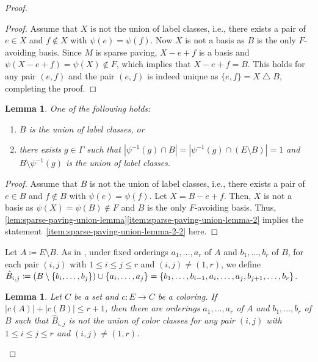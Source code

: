 \documentclass{article}
\DeclarePairedDelimiter{\set}{\{}{\}}
\newcommand{\symdif}{\mathbin{\triangle}}
\newtheorem{lemma}[theorem]{Lemma}
\theoremstyle{definition}
\begin{document}
\begin{proof}
\begin{proof}
    Assume that $X$ is not the union of label classes, i.e., there exists a pair of $e \in X$ and $f \notin X$ with $\psi(e) = \psi(f)$.
    Now $X$ is not a basis as $B$ is the only $F$-avoiding basis.
    Since $M$ is sparse paving, $X - e + f$ is a basis and $\psi(X - e + f) = \psi(X) \notin F$, which implies that $X - e + f = B$.
    This holds for any pair $(e, f)$ and the pair $(e, f)$ is indeed unique as $\{e, f\} = X \symdif B$, completing
    the proof.
\end{proof}

\begin{lemma}\label{lem:sparse-paving-union-lemma-2}
    One of the following holds:
    \begin{enumerate}[{label={\upshape (\arabic*)}}]
        \item $B$ is the union of label classes, or
        \item there exists $g \in \Gamma$ such that $|\psi^{-1}(g) \cap B| = |\psi^{-1}(g) \cap (E \setminus B)| = 1$ and $B \setminus \psi^{-1}(g)$ is the union of label classes.\label{item:sparse-paving-union-lemma-2-2}
    \end{enumerate}
\end{lemma}

\begin{proof}
    Assume that $B$ is not the union of label classes, i.e., there exists a pair of $e \in B$ and $f \notin B$ with $\psi(e) = \psi(f)$.
    Let $X = B - e + f$.
    Then, $X$ is not a basis as $\psi(X) = \psi(B) \notin F$ and $B$ is the only $F$-avoiding basis.
    Thus, \cref{lem:sparse-paving-union-lemma}\ref{item:sparse-paving-union-lemma-2} implies the statement~\ref{item:sparse-paving-union-lemma-2-2} here.
\end{proof}

Let $A \coloneqq E \setminus B$.
As in , under fixed orderings $a_1, \dotsc, a_r$ of $A$ and $b_1, \dotsc, b_r$ of $B$, for each pair $(i, j)$ with $1 \le i \le j \le r$ and $(i, j) \neq (1, r)$, we define $\hat{B}_{i,j}\coloneqq (B \setminus \set{b_i, \dotsc, b_j}) \cup \set{a_i, \dotsc, a_j} = \set{b_1,\dotsc, b_{i-1}, a_{i},\dotsc, a_j, b_{j+1},\dotsc, b_r}$.

\begin{lemma}
\label{lem:coloring-ordering}
    Let $C$ be a set and $c\colon E \to C$ be a coloring.
    If $|c(A)| + |c(B)| \le r+1$, then there are orderings $a_1, \dotsc, a_r$ of $A$ and $b_1, \dotsc, b_r$ of $B$ such that $\hat{B}_{i,j}$ is not the union of color classes for any pair $(i, j)$ with $1 \le i \le j \le r$ and $(i, j) \neq (1, r)$. 
\end{lemma}
 

\end{proof}
\end{document}
